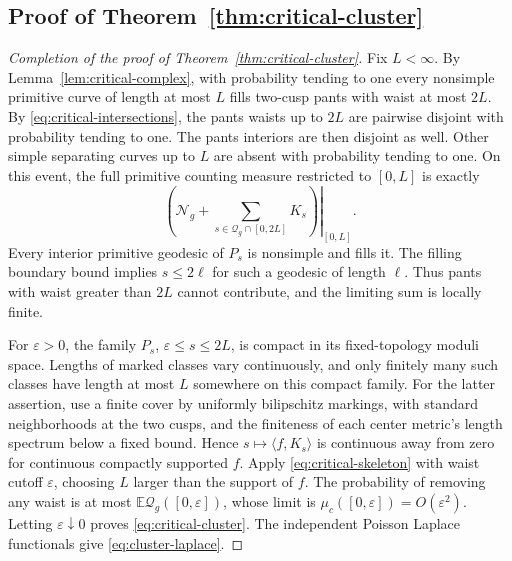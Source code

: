 \subsection{Proof of Theorem~\ref{thm:critical-cluster}}

\begin{proof}[Completion of the proof of Theorem~\ref{thm:critical-cluster}]
Fix $L<\infty$. By Lemma~\ref{lem:critical-complex}, with probability
tending to one every nonsimple primitive curve of length at most $L$
fills two-cusp pants with waist at most $2L$. By
\eqref{eq:critical-intersections}, the pants waists up to $2L$ are
pairwise disjoint with probability tending to one. The pants interiors
are then disjoint as well. Other simple separating curves up to $L$
are absent with probability tending to one. On this event, the full
primitive counting measure restricted to $[0,L]$ is exactly
\[
 \left.\left(\mathcal N_g+
       \sum_{s\in\mathcal Q_g\cap[0,2L]}K_s\right)\right|_{[0,L]}.
\]
Every interior primitive geodesic of $P_s$ is nonsimple and fills it.
The filling boundary bound implies $s\le2\ell$ for such a geodesic
of length $\ell$. Thus pants with waist greater than $2L$ cannot
contribute, and the limiting sum is locally finite.

For $\varepsilon>0$, the family $P_s$, $\varepsilon\le s\le2L$,
is compact in its fixed-topology moduli space. Lengths of marked
classes vary continuously, and only finitely many such classes have
length at most $L$ somewhere on this compact family. For the latter
assertion, use a finite cover by uniformly bilipschitz markings,
with standard neighborhoods at the two cusps, and the finiteness of
each center metric's length spectrum below a fixed bound. Hence
$s\mapsto\langle f,K_s\rangle$ is continuous away from zero for
continuous compactly supported $f$. Apply \eqref{eq:critical-skeleton}
with waist cutoff $\varepsilon$, choosing $L$ larger than the support
of $f$. The probability of removing any waist is at most
$\mathbb E\mathcal Q_g([0,\varepsilon])$, whose limit is
$\mu_c([0,\varepsilon])=O(\varepsilon^2)$. Letting
$\varepsilon\downarrow0$ proves \eqref{eq:critical-cluster}.
The independent Poisson Laplace functionals give
\eqref{eq:cluster-laplace}.
\end{proof}
